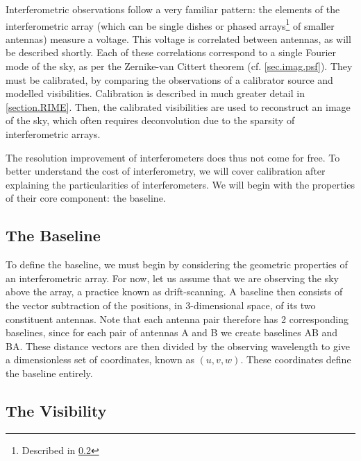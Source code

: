 \pg
Interferometric observations follow a very familiar pattern: the elements of the interferometric array (which can be single dishes or phased arrays\footnote{Described in \cref{sec.visibility}} of smaller antennas) measure a voltage. This voltage is correlated between antennas, as will be described shortly. Each of these correlations correspond to a single Fourier mode of the sky, as per the Zernike-van Cittert theorem (cf. \cref{sec.imag.psf}). They must be calibrated, by comparing the observations of a calibrator source and modelled visibilities. Calibration is described in much greater detail in \cref{section.RIME}. Then, the calibrated visibilities are used to reconstruct an image of the sky, which often requires deconvolution due to the sparsity of interferometric arrays.

\pg
The resolution improvement of interferometers does thus not come for free. To better understand the cost of interferometry, we will cover calibration after explaining the particularities of interferometers. We will begin with the properties of their core component: the baseline.

\subsection{The Baseline}

\pg
To define the baseline, we must begin by considering the geometric properties of an interferometric array. For now, let us assume that we are observing the sky above the array, a practice known as drift-scanning. A baseline then consists of the vector subtraction of the positions, in 3-dimensional space, of its two constituent antennas. Note that each antenna pair therefore has 2 corresponding baselines, since for each pair of antennas A and B we create baselines AB and BA. These distance vectors are then divided by the observing wavelength to give a dimensionless set of coordinates, known as $(u,v,w)$. These coordinates define the baseline entirely. 

\subsection{The Visibility}\label{sec.visibility}

